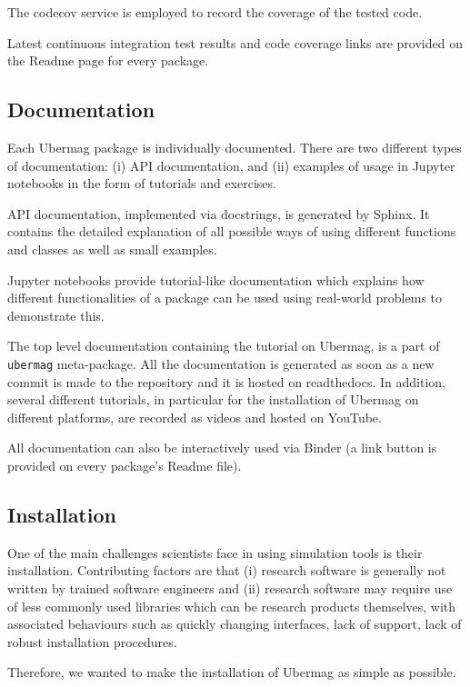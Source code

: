 \documentclass{deliverablereport}
\begin{document}
The codecov service is employed to record the
coverage of the tested code.

Latest continuous integration test results and code coverage links are
provided on the Readme page for every package.

\subsection{Documentation}

Each Ubermag package is individually
documented. There are two different types of documentation: (i) API
documentation, and (ii) examples of usage in Jupyter notebooks in the
form of tutorials and exercises.

API documentation, implemented via
docstrings, is generated by Sphinx. It contains the detailed
explanation of all possible ways of using different functions and
classes as well as small examples.

Jupyter notebooks provide tutorial-like documentation which explains
how different functionalities of a package can be used using
real-world problems to demonstrate this.

The top level documentation containing the tutorial on Ubermag, is a
part of \texttt{ubermag} meta-package. All the documentation is
generated as soon as a new commit is made to the repository and it is
hosted on readthedocs. In addition, several different tutorials, in
particular for the installation of Ubermag on different platforms, are
recorded as videos and hosted on YouTube.

All documentation can also be interactively used via Binder (a link
button is provided on every package's Readme file).

\subsection{Installation}

One of the main challenges scientists face in using simulation tools
is their installation. Contributing factors are that (i) research
software is generally not written by trained software engineers and
(ii) research software may require use of less commonly used libraries
which can be research products themselves, with associated behaviours
such as quickly changing interfaces, lack of support, lack of robust
installation procedures.

Therefore, we wanted to make the installation of Ubermag as simple as
possible.
\end{document}
